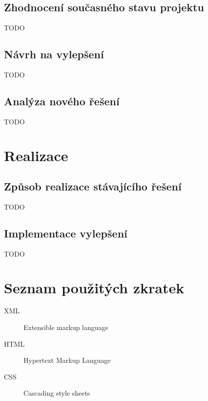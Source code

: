 \documentclass[thesis=B,czech]{FITthesis}[2012/06/26]
\begin{document}
\section{Zhodnocení současného stavu projektu}
TODO
\section{Návrh na vylepšení}
TODO
\section{Analýza nového řešení}
TODO


\chapter{Realizace}

\section{Způsob realizace stávajícího řešení}
TODO
\section{Implementace vylepšení}
TODO

\begin{conclusion}
\end{conclusion}






\appendix
\chapter{Seznam použitých zkratek}
\begin{description}
	\item[XML] Extensible markup language
	\item[HTML] Hypertext Markup Language
	\item[CSS] Cascading style sheets
\end{description}
\end{document}
